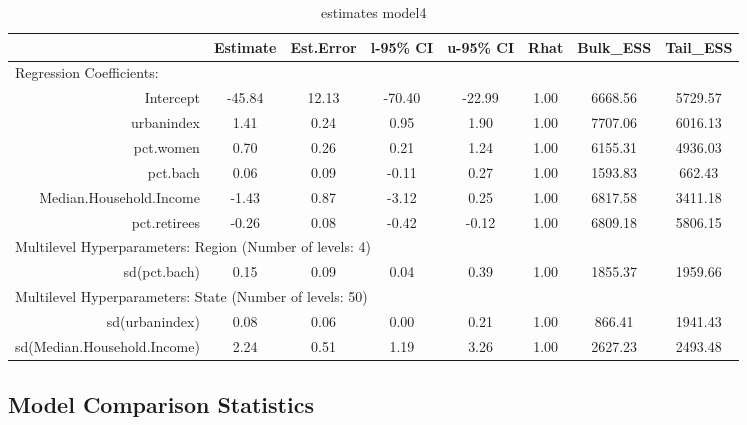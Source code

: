 \documentclass[12pt]{article}
\begin{document}
\begin{table}[ht]
	\centering
	\begin{adjustbox}{max width=\textwidth}
	\begin{tabular}{rccccccc}
		\hline
		& Estimate & Est.Error & l-95\% CI & u-95\% CI & Rhat & Bulk\_ESS & Tail\_ESS \\ 
		\hline
				 \multicolumn{8}{l}{Regression Coefficients:} \\
		Intercept & -45.84 & 12.13 & -70.40 & -22.99 & 1.00 & 6668.56 & 5729.57 \\ 
		urbanindex & 1.41 & 0.24 & 0.95 & 1.90 & 1.00 & 7707.06 & 6016.13 \\ 
		pct.women & 0.70 & 0.26 & 0.21 & 1.24 & 1.00 & 6155.31 & 4936.03 \\ 
		pct.bach & 0.06 & 0.09 & -0.11 & 0.27 & 1.00 & 1593.83 & 662.43 \\ 
		Median.Household.Income & -1.43 & 0.87 & -3.12 & 0.25 & 1.00 & 6817.58 & 3411.18 \\ 
		pct.retirees & -0.26 & 0.08 & -0.42 & -0.12 & 1.00 & 6809.18 & 5806.15 \\
		\midrule
		\multicolumn{8}{l}{Multilevel Hyperparameters: Region (Number of levels: 4)} \\ 
		sd(pct.bach) & 0.15 & 0.09 & 0.04 & 0.39 & 1.00 & 1855.37 & 1959.66 \\
		\midrule
		\multicolumn{8}{l}{Multilevel Hyperparameters: State (Number of levels: 50)}                       \\  
		sd(urbanindex) & 0.08 & 0.06 & 0.00 & 0.21 & 1.00 & 866.41 & 1941.43 \\ 
		sd(Median.Household.Income) & 2.24 & 0.51 & 1.19 & 3.26 & 1.00 & 2627.23 & 2493.48 \\ 
		\hline
	\end{tabular}
	\end{adjustbox}
	\caption{estimates model4}
	\label{tab:model4}
\end{table}







\FloatBarrier

\subsection*{Model Comparison Statistics}
\end{document}
